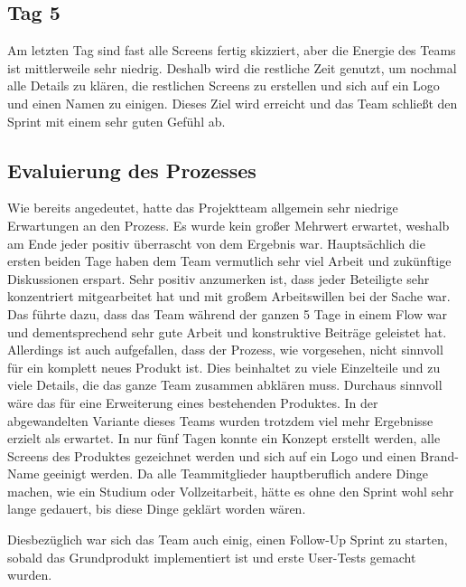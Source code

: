 \subsection*{\label{sec:Sprint-Umsetzung-Tag5}\thesubsection\quad Tag 5}Am letzten Tag sind fast alle Screens fertig skizziert, aber die Energie des Teams ist mittlerweile sehr niedrig. Deshalb wird die restliche Zeit genutzt, um nochmal alle Details zu klären, die restlichen Screens zu erstellen und sich auf ein Logo und einen Namen zu einigen. Dieses Ziel wird erreicht und das Team schließt den Sprint mit einem sehr guten Gefühl ab.


\subsection*{Evaluierung des Prozesses}
Wie bereits angedeutet, hatte das Projektteam allgemein sehr niedrige Erwartungen an den Prozess. Es wurde kein großer Mehrwert erwartet, weshalb am Ende jeder positiv überrascht von dem Ergebnis war. Hauptsächlich die ersten beiden Tage haben dem Team vermutlich sehr viel Arbeit und zukünftige Diskussionen erspart. Sehr positiv anzumerken ist, dass jeder Beteiligte sehr konzentriert mitgearbeitet hat und mit großem Arbeitswillen bei der Sache war. Das führte dazu, dass das Team während der ganzen 5 Tage in einem Flow war und dementsprechend sehr gute Arbeit und konstruktive Beiträge geleistet hat. Allerdings ist auch aufgefallen, dass der Prozess, wie vorgesehen, nicht sinnvoll für ein komplett neues Produkt ist. Dies beinhaltet zu viele Einzelteile und zu viele Details, die das ganze Team zusammen abklären muss. Durchaus sinnvoll wäre das für eine Erweiterung eines bestehenden Produktes. In der abgewandelten Variante dieses Teams wurden trotzdem viel mehr Ergebnisse erzielt als erwartet. In nur fünf Tagen konnte ein Konzept erstellt werden, alle Screens des Produktes gezeichnet werden und sich auf ein Logo und einen Brand-Name geeinigt werden. Da alle Teammitglieder hauptberuflich andere Dinge machen, wie ein Studium oder Vollzeitarbeit, hätte es ohne den Sprint wohl sehr lange gedauert, bis diese Dinge geklärt worden wären.

Diesbezüglich war sich das Team auch einig, einen Follow-Up Sprint zu starten, sobald das Grundprodukt implementiert ist und erste User-Tests gemacht wurden.
